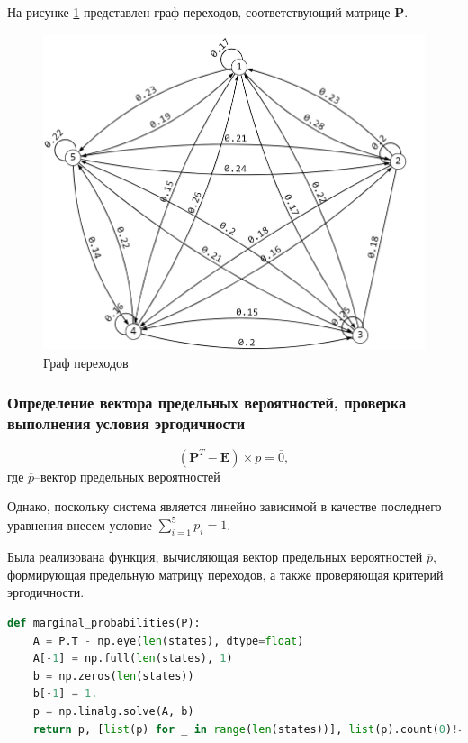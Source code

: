 На рисунке \ref{graph} представлен граф переходов, соответствующий матрице $\mathbf{P}$.
\begin{figure}[!h]
\centerline{\includegraphics[scale = 1.1]{Images/graph.jpg}}
\caption{Граф переходов}
\label{graph}
\end{figure}

\subsubsection{Определение вектора предельных вероятностей, проверка выполнения условия эргодичности}


$$(\mathbf{P}^T-\mathbf{E})\times\overline{p}=\overline{0},$$
где $\overline{p}$--вектор предельных вероятностей

Однако, поскольку система является линейно зависимой в качестве последнего уравнения внесем условие $\sum\limits_{i=1}^5p_i=1$.

Была реализована функция, вычисляющая вектор предельных вероятностей  $\overline{p}$, формирующая предельную матрицу переходов, а также проверяющая критерий эргодичности.

\begin{lstlisting}[language=python, label=prog,caption={\textit{расчет вектора предельных вероятностей}}]
def marginal_probabilities(P):
    A = P.T - np.eye(len(states), dtype=float)
    A[-1] = np.full(len(states), 1)
    b = np.zeros(len(states))
    b[-1] = 1.
    p = np.linalg.solve(A, b)
    return p, [list(p) for _ in range(len(states))], list(p).count(0)!=len(p)
\end{lstlisting}


